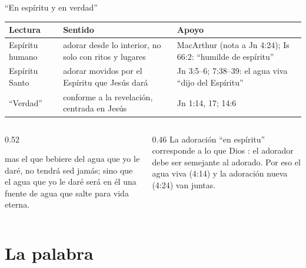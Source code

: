 \begin{frame}{``En espíritu y en verdad''}
\scriptsize\renewcommand{\arraystretch}{1.2}
\begin{tabular}{@{}>{\RaggedRight\arraybackslash}p{2.6cm}>{\RaggedRight\arraybackslash}p{4.6cm}>{\RaggedRight\arraybackslash}p{4.6cm}@{}}
\toprule
\textbf{Lectura} & \textbf{Sentido} & \textbf{Apoyo} \\ \midrule
Espíritu humano & adorar desde lo interior, no solo con ritos y lugares & MacArthur (nota a Jn 4:24); Is 66:2: ``humilde de espíritu'' \\
Espíritu Santo & adorar movidos por el Espíritu que Jesús dará & Jn 3:5--6; 7:38--39: el agua viva ``dijo del Espíritu'' \\
``Verdad'' & conforme a la revelación, centrada en Jesús & Jn 1:14, 17; 14:6 \\
\bottomrule
\end{tabular}\par\medskip
\begin{columns}[t,onlytextwidth]
\begin{column}{0.52\textwidth}
\begin{cita}mas el que bebiere del agua que yo le daré, no tendrá sed jamás; sino que el agua que yo le daré será en él una fuente de agua que salte para vida eterna.\end{cita}
\end{column}
\begin{column}{0.46\textwidth}\small
La adoración ``en espíritu'' corresponde a lo que Dios : el adorador debe ser semejante al adorado. Por eso el agua viva (4:14) y la adoración nueva (4:24) van juntas.
\end{column}
\end{columns}
\end{frame}

\section{La palabra}

